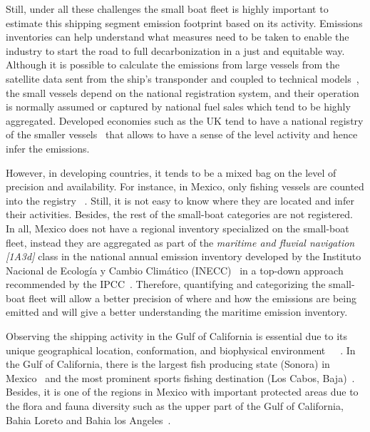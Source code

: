 Still, under all these challenges the small boat fleet is highly important to estimate this shipping segment emission footprint based on its activity. Emissions inventories can help understand what measures need to be taken to enable the industry to start the road to full decarbonization in a just and equitable way. Although it is possible to calculate the emissions from large vessels from the satellite data sent from the ship's transponder and coupled to technical models~\cite{IMO2021Fourth}, the small vessels depend on the national registration system, and their operation is normally assumed or captured by national fuel sales which tend to be highly aggregated. Developed economies such as the UK tend to have a national registry of the smaller vessels~\cite{uk2021registration} that allows to have a sense of the level activity and hence infer the  emissions.

However, in developing countries, it tends to be a mixed bag on the level of precision and availability. For instance, in Mexico, only fishing vessels are counted into the registry ~\cite{Mexico2021RegisteredVessels}. Still, it is not easy to know where they are located and infer their activities. Besides, the rest of the small-boat categories are not registered. In all, Mexico does not have a regional  inventory specialized on the small-boat fleet, instead they are aggregated as part of the \textit{maritime and fluvial navigation [1A3d]} class in the national annual emission inventory developed by the Instituto Nacional de Ecología y Cambio Climático (INECC)~\cite{inecc2020inventario} in a top-down approach recommended by the IPCC~\cite{eggleston20062006}. Therefore, quantifying and categorizing the small-boat fleet will allow a better precision of where and how the emissions are being emitted and will give a better understanding the maritime emission inventory.

Observing the shipping activity in the Gulf of California is essential due to its unique geographical location, conformation, and biophysical environment~\cite{LLUCHCOTA20071}~\cite{munguia2018ecological}~\cite{MARINONE2012133}. In the Gulf of California, there is the largest fish producing state (Sonora) in Mexico~\cite{MELTZER2006222} and the most prominent sports fishing destination (Los Cabos, Baja)~\cite{hernandez2012economic}. Besides, it is one of the regions in Mexico with important protected areas due to the flora and fauna diversity such as the upper part of the Gulf of California, Bahia Loreto and Bahia los Angeles~\cite{CNANP2022Atlas, SMARN2022Islas}. 




